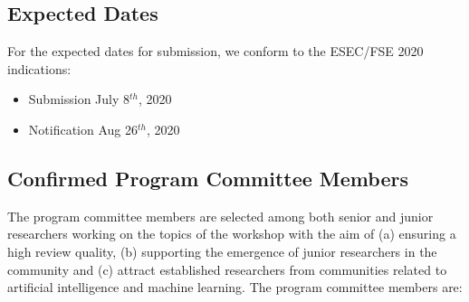 \subsection{Expected Dates}
For the expected dates for submission, we conform to the ESEC/FSE 2020 indications:
\begin{itemize}[itemsep=0.5em]
	\item Submission July 8$^{th}$, 2020
	\item Notification Aug 26$^{th}$, 2020
\end{itemize}

\subsection{Confirmed Program Committee Members}
The program committee members are selected among both senior and junior researchers working on the topics of the workshop with the aim of (a) ensuring a high review quality, (b) supporting the emergence of junior researchers in the community and (c) attract established researchers from communities related to artificial intelligence and machine learning.
The program committee members are:
